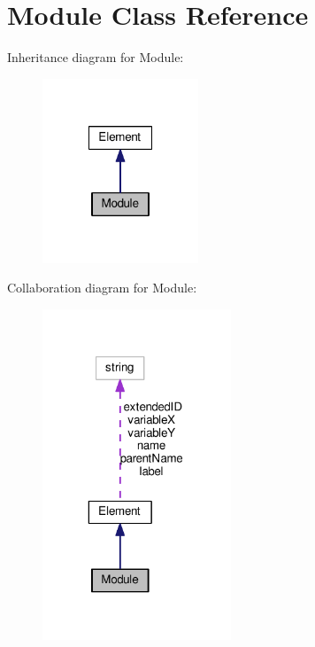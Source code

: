 \hypertarget{classModule}{\section{Module Class Reference}
\label{classModule}
}


Inheritance diagram for Module\+:
\nopagebreak
\begin{figure}[H]
\begin{center}
\leavevmode
\includegraphics[width=132pt]{classModule__inherit__graph}
\end{center}
\end{figure}


Collaboration diagram for Module\+:
\nopagebreak
\begin{figure}[H]
\begin{center}
\leavevmode
\includegraphics[width=160pt]{classModule__coll__graph}
\end{center}
\end{figure}
